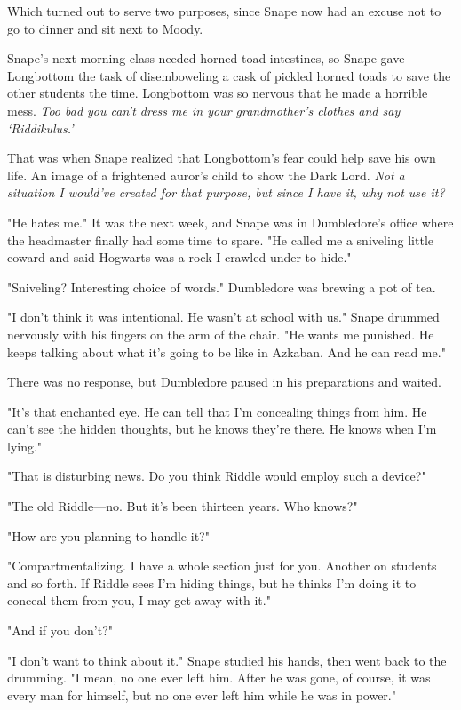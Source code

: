Which turned out to serve two purposes, since Snape now had an excuse not to go to dinner and sit next to Moody.

Snape's next morning class needed horned toad intestines, so Snape gave Longbottom the task of disemboweling a cask of pickled horned toads to save the other students the time. Longbottom was so nervous that he made a horrible mess. \emph{Too bad you can't dress me in your grandmother's clothes and say `Riddikulus.'}

That was when Snape realized that Longbottom's fear could help save his own life. An image of a frightened auror's child to show the Dark Lord. \emph{Not a situation I would've created for that purpose, but since I have it, why not use it?}

"He hates me." It was the next week, and Snape was in Dumbledore's office where the headmaster finally had some time to spare. "He called me a sniveling little coward and said Hogwarts was a rock I crawled under to hide."

"Sniveling? Interesting choice of words." Dumbledore was brewing a pot of tea.

"I don't think it was intentional. He wasn't at school with us." Snape drummed nervously with his fingers on the arm of the chair. "He wants me punished. He keeps talking about what it's going to be like in Azkaban. And he can read me."

There was no response, but Dumbledore paused in his preparations and waited.

"It's that enchanted eye. He can tell that I'm concealing things from him. He can't see the hidden thoughts, but he knows they're there. He knows when I'm lying."

"That is disturbing news. Do you think Riddle would employ such a device?"

"The old Riddle—no. But it's been thirteen years. Who knows?"

"How are you planning to handle it?"

"Compartmentalizing. I have a whole section just for you. Another on students and so forth. If Riddle sees I'm hiding things, but he thinks I'm doing it to conceal them from you, I may get away with it."

"And if you don't?"

"I don't want to think about it." Snape studied his hands, then went back to the drumming. "I mean, no one ever left him. After he was gone, of course, it was every man for himself, but no one ever left him while he was in power."

